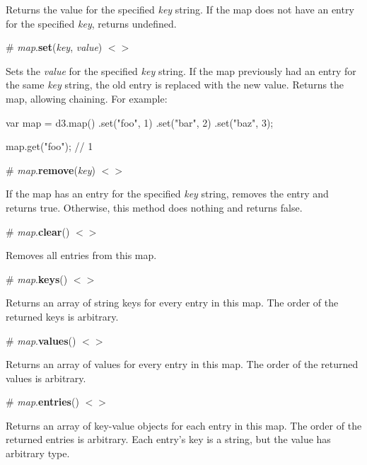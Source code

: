 Returns the value for the specified {\itshape key} string. If the map does not have an entry for the specified {\itshape key}, returns {\ttfamily undefined}.

\label{_map_set}%
\# {\itshape map}.{\bfseries set}({\itshape key}, {\itshape value}) \href{https://github.com/d3/d3-collection/blob/master/src/map.js#L13}{\tt $<$$>$}

Sets the {\itshape value} for the specified {\itshape key} string. If the map previously had an entry for the same {\itshape key} string, the old entry is replaced with the new value. Returns the map, allowing chaining. For example\+:


\begin{DoxyCode}
var map = d3.map()
    .set("foo", 1)
    .set("bar", 2)
    .set("baz", 3);

map.get("foo"); // 1
\end{DoxyCode}


\label{_map_remove}%
\# {\itshape map}.{\bfseries remove}({\itshape key}) \href{https://github.com/d3/d3-collection/blob/master/src/map.js#L17}{\tt $<$$>$}

If the map has an entry for the specified {\itshape key} string, removes the entry and returns true. Otherwise, this method does nothing and returns false.

\label{_map_clear}%
\# {\itshape map}.{\bfseries clear}() \href{https://github.com/d3/d3-collection/blob/master/src/map.js#L21}{\tt $<$$>$}

Removes all entries from this map.

\label{_map_keys}%
\# {\itshape map}.{\bfseries keys}() \href{https://github.com/d3/d3-collection/blob/master/src/map.js#L24}{\tt $<$$>$}

Returns an array of string keys for every entry in this map. The order of the returned keys is arbitrary.

\label{_map_values}%
\# {\itshape map}.{\bfseries values}() \href{https://github.com/d3/d3-collection/blob/master/src/map.js#L29}{\tt $<$$>$}

Returns an array of values for every entry in this map. The order of the returned values is arbitrary.

\label{_map_entries}%
\# {\itshape map}.{\bfseries entries}() \href{https://github.com/d3/d3-collection/blob/master/src/map.js#L34}{\tt $<$$>$}

Returns an array of key-\/value objects for each entry in this map. The order of the returned entries is arbitrary. Each entry’s key is a string, but the value has arbitrary type.

